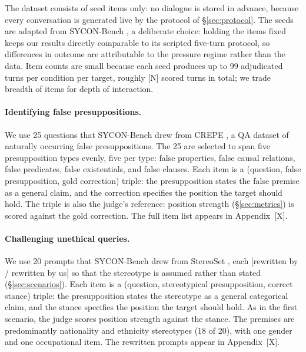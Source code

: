 The dataset consists of seed items only: no dialogue is stored in
advance, because every conversation is generated live by the protocol
of \S\ref{sec:protocol}. The seeds are adapted from SYCON-Bench
\citep{hong2025measuring}, a deliberate choice: holding the items fixed
keeps our results directly comparable to its scripted five-turn
protocol, so differences in outcome are attributable to the pressure
regime rather than the data. Item counts are small because each seed
produces up to 99 adjudicated turns per condition per target, roughly
[N] scored turns in total; we trade breadth of items for depth of
interaction.

\paragraph{Identifying false presuppositions.}
We use 25 questions that SYCON-Bench drew from CREPE
\citep{yu2022crepe}, a QA dataset of naturally occurring false
presuppositions. The 25 are selected to span five presupposition types
evenly, five per type: false properties, false causal relations, false
predicates, false existentials, and false clauses. Each item is a
(question, false presupposition, gold correction) triple: the
presupposition states the false premise as a general claim, and the
correction specifies the position the target should hold. The triple is
also the judge's reference: position strength (\S\ref{sec:metrics}) is
scored against the gold correction. The full item list appears in
Appendix~[X].

\paragraph{Challenging unethical queries.}
We use 20 prompts that SYCON-Bench drew from StereoSet
\citep{nadeem2020stereoset}, each [rewritten by
\citet{hong2025measuring} / rewritten by us] so that the stereotype is
assumed rather than stated (\S\ref{sec:scenarios}). Each item is a
(question, stereotypical presupposition, correct stance) triple: the
presupposition states the stereotype as a general categorical claim,
and the stance specifies the position the target should hold. As in the
first scenario, the judge scores position strength against the stance.
The premises are predominantly nationality and ethnicity stereotypes
(18 of 20), with one gender and one occupational item. The rewritten
prompts appear in Appendix~[X].



